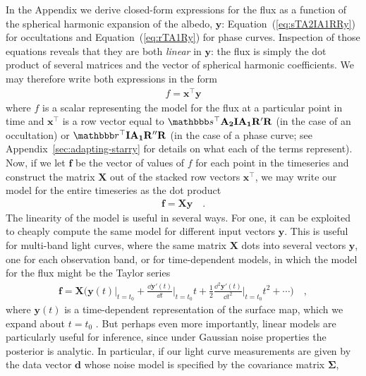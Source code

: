 \documentclass[modern]{aastex62}
\begin{document}
In the Appendix we derive closed-form expressions for the flux
as a function of the spherical harmonic expansion of the albedo,
$\mathbf{y}$: Equation~(\ref{eq:sTA2IA1RRy}) for occultations and
Equation~(\ref{eq:rTA1Ry}) for phase curves. Inspection of those
equations reveals that they are both \emph{linear} in $\mathbf{y}$:
the flux is simply the dot product of several matrices and the
vector of spherical harmonic coefficients. We may therefore write
both expressions in the form
%
\begin{align}
    f = \mathbf{x}^\top \mathbf{y}
\end{align}
%
where $f$ is a scalar representing the model for the flux at a particular
point in time and $\mathbf{x}^\top$ is a row vector equal to
$\sT\mathbf{A_2}\mathbf{I}\mathbf{A_1}\mathbf{R'}\mathbf{R}$
(in the case of an occultation)
or
$\rT\mathbf{I}\mathbf{A_1}\mathbf{R''}\mathbf{R}$
(in the case of a phase curve; see Appendix~\ref{sec:adapting-starry}
for details on what each of the terms represent). Now, if we let $\mathbf{f}$
be the vector of values of $f$ for each point in the timeseries and
construct the matrix $\mathbf{X}$ out of the stacked row vectors
$\mathbf{x}^\top$, we may write our model for the entire timeseries as
the dot product
%
\begin{align}
    \mathbf{f} = \mathbf{X} \mathbf{y}
    \quad.
\end{align}
%
The linearity of the \starry model is useful in several ways. For one,
it can be exploited to cheaply compute the same model for different
input vectors $\mathbf{y}$. This is useful for multi-band light curves,
where the same matrix $\mathbf{X}$ dots into several vectors $\mathbf{y}$,
one for each observation band, or for time-dependent models, in which
the model for the flux might be the Taylor series
%
\begin{align}
    \mathbf{f} =
    \mathbf{X}
    \bigg(
    \mathbf{y}(t)\bigg|_{t=t_0} +
    \frac{\dd\mathbf{y'}(t)}{\dd t}\bigg|_{t=t_0} t +
    \frac{1}{2}\frac{\dd^2\mathbf{y'}(t)}{\dd t^2}\bigg|_{t=t_0} t^2 +
    \cdots
    \bigg)
    \quad,
\end{align}
%
where $\mathbf{y}(t)$ is a time-dependent representation of the surface
map, which we expand about $t=t_0$ \citep[see][]{Luger2019b}.
But perhaps even more importantly, linear
models are particularly useful for inference, since under Gaussian
noise properties the posterior is analytic. In particular, if
our light curve measurements are given by the data vector $\mathbf{d}$
whose noise model is specified by the covariance matrix $\pmb{\Sigma}$,
\end{document}
